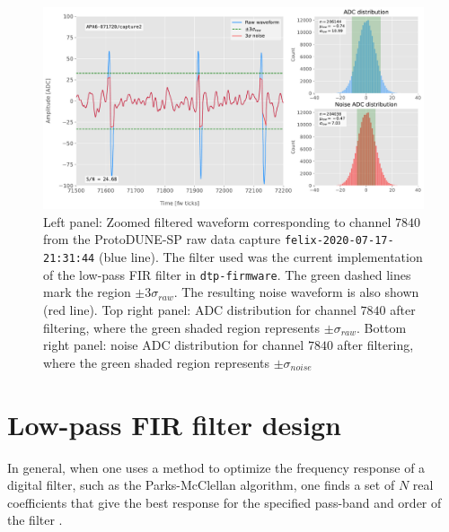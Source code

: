 \begin{figure}[t]
	\centering
	\includegraphics[width=1\linewidth]{Images/Matched_Filter/waveform_example_fir}
	\caption[Example filtered waveform from a ProtoDUNE-SP raw data capture.]{Left panel: Zoomed filtered waveform corresponding to channel $7840$ from the ProtoDUNE-SP raw data capture \texttt{felix-2020-07-17-21:31:44} (blue line). The filter used was the current implementation of the low-pass FIR filter in \texttt{dtp-firmware}. The green dashed lines mark the region $\pm3\sigma_{raw}$. The resulting noise waveform is also shown (red line). Top right panel: ADC distribution for channel $7840$ after filtering, where the green shaded region represents $\pm \sigma_{raw}$. Bottom right panel: noise ADC distribution for channel $7840$ after filtering, where the green shaded region represents $\pm \sigma_{noise}$}
	\label{fig:adcs_fir}
\end{figure}

\section{Low-pass FIR filter design}
\label{sec:matched_filter_fir}

In general, when one uses a method to optimize the frequency response of a digital filter, such as the Parks-McClellan algorithm, one finds a set of $N$ real coefficients that give the best response for the specified pass-band and order of the filter \cite{McClellan2005}.

